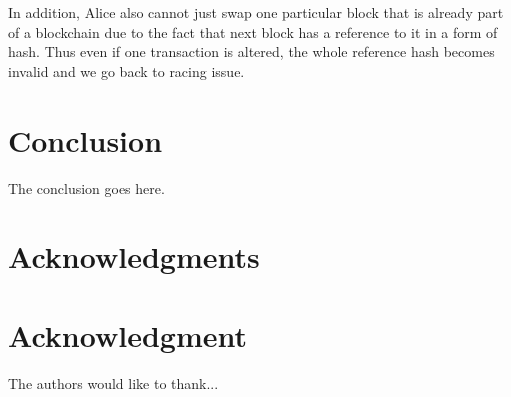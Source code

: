 \documentclass[conference,compsoc]{IEEEtran}
\begin{document}
In addition, Alice also cannot just swap one particular block that is already part of a blockchain due to the fact that next block has a reference to it in a form of hash. 
Thus even if one transaction is altered, the whole reference hash becomes invalid and we go back to racing issue.




\section{Conclusion}
The conclusion goes here.







\ifCLASSOPTIONcompsoc
  \section*{Acknowledgments}
\else
  \section*{Acknowledgment}
\fi


The authors would like to thank...







%
%
%




\end{document}
